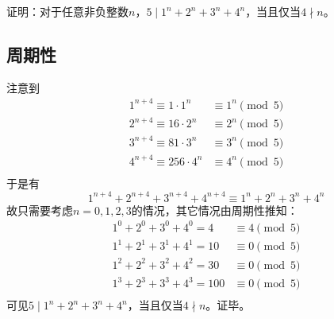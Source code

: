 

证明：对于任意非负整数$n$，$5 \mid 1^n + 2^n + 3^n + 4^n$，当且仅当$4 \nmid n$。

\subsection{周期性}

注意到
\begin{align*}
  1^{n + 4} \equiv 1\cdot1^n &\equiv 1^n \pmod 5 \\
  2^{n + 4} \equiv 16\cdot2^n &\equiv 2^n \pmod 5 \\
  3^{n + 4} \equiv 81\cdot3^n &\equiv 3^n \pmod 5 \\
  4^{n + 4} \equiv 256\cdot4^n &\equiv 4^n \pmod 5 \\
\end{align*}
于是有
\[ 1^{n + 4} + 2^{n + 4} + 3^{n + 4} + 4^{n + 4} \equiv 1^n + 2^n + 3^n + 4^n \]
故只需要考虑$n = 0, 1, 2, 3$的情况，其它情况由周期性推知：
\begin{align*}
  1^0 + 2^0 + 3^0 + 4^0 = 4 &\equiv 4 \pmod 5 \\
  1^1 + 2^1 + 3^1 + 4^1 = 10 &\equiv 0 \pmod 5 \\
  1^2 + 2^2 + 3^2 + 4^2 = 30 &\equiv 0 \pmod 5 \\
  1^3 + 2^3 + 3^3 + 4^3 = 100 &\equiv 0 \pmod 5 \\
\end{align*}
可见$5 \mid 1^n + 2^n + 3^n + 4^n$，当且仅当$4 \nmid n$。证毕。
